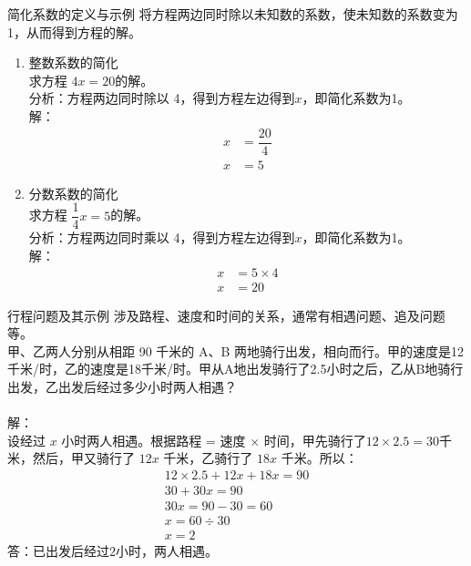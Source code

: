 \documentclass{ctexbeamer}
\begin{document}
\begin{frame}{简化系数的定义与示例}
将方程两边同时除以未知数的系数，使未知数的系数变为 1，从而得到方程的解。
\begin{enumerate}[label={\arabic*.}]
\item \alert{整数系数的简化} \\
求方程 \(4x = 20\)的解。\\
分析：方程两边同时除以 4，得到方程左边得到$x$，即简化系数为1。\\
解：
\pause
\begin{align*}
x &= \dfrac{20}{4} \\
x &= 5
\end{align*}

\item \alert{分数系数的简化} \\
求方程 \(\dfrac{1}{4}x = 5\)的解。\\
分析：方程两边同时乘以 4，得到方程左边得到$x$，即简化系数为1。\\
解：
\pause
\begin{align*}
x &= 5 \times 4 \\
x &= 20
\end{align*}

\end{enumerate}
\end{frame}

\begin{frame}[t]{行程问题及其示例}
涉及路程、速度和时间的关系，通常有相遇问题、追及问题等。\\
甲、乙两人分别从相距 90 千米的 A、B 两地骑行出发，相向而行。甲的速度是12千米/时，乙的速度是18千米/时。甲从A地出发骑行了2.5小时之后，乙从B地骑行出发，乙出发后经过多少小时两人相遇？\\
\\
解：\\
\pause
设经过 \(x\) 小时两人相遇。根据路程 = 速度 × 时间，甲先骑行了$12 \times 2.5 = 30$千米，然后，甲又骑行了 \(12x\) 千米，乙骑行了 \(18x\) 千米。所以：\\
\begin{align*}
 12 \times 2.5 + 12x + 18x = 90 \\
30 + 30x = 90 \\
30x = 90 - 30 = 60 \\
x = 60 \div 30 \\
x = 2
\end{align*}
答：已出发后经过$2$小时，两人相遇。
\end{frame}
\end{document}

